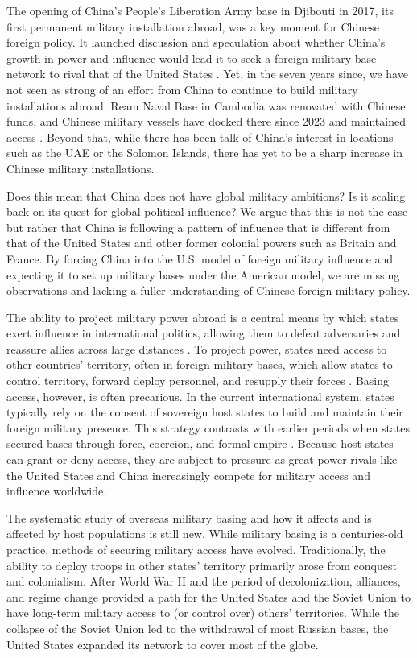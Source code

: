 The opening of China's People's Liberation Army base in Djibouti in 2017, its first permanent military installation abroad, was a key moment for Chinese foreign policy. It launched discussion and speculation about whether China's growth in power and influence would lead it to seek a foreign military base network to rival that of the United States \cite{vertin2020}. Yet, in the seven years since, we have not seen as strong of an effort from China to continue to build military installations abroad. Ream Naval Base in Cambodia was renovated with Chinese funds, and Chinese military vessels have docked there since 2023 and maintained access \cite{gan2023}. Beyond that, while there has been talk of China's interest in locations such as the UAE or the Solomon Islands, there has yet to be a sharp increase in Chinese military installations.

Does this mean that China does not have global military ambitions? Is it scaling back on its quest for global political influence? We argue that this is not the case but rather that China is following a pattern of influence that is different from that of the United States and other former colonial powers such as Britain and France. By forcing China into the U.S. model of foreign military influence and expecting it to set up military bases under the American model, we are missing observations and lacking a fuller understanding of Chinese foreign military policy. 

The ability to project military power abroad is a central means by which states exert influence in international politics, allowing them to defeat adversaries and reassure allies across large distances \cite{levy2010,markowitz2013,blankenship2022}. To project power, states need access to other countries' territory, often in foreign military bases, which allow states to control territory, forward deploy personnel, and resupply their forces \cite{Harkavy1989,posen2003}. Basing access, however, is often precarious. In the current international system, states typically rely on the consent of sovereign host states to build and maintain their foreign military presence. This strategy contrasts with earlier periods when states secured bases through force, coercion, and formal empire \cite{schmidt2020}. Because host states can grant or deny access, they are subject to pressure as great power rivals like the United States and China increasingly compete for military access and influence worldwide.

The systematic study of overseas military basing and how it affects and is affected by host populations is still new. While military basing is a centuries-old practice, methods of securing military access have evolved. Traditionally, the ability to deploy troops in other states' territory primarily arose from conquest and colonialism. After World War II and the period of decolonization, alliances, and regime change provided a path for the United States and the Soviet Union to have long-term military access to (or control over) others' territories. While the collapse of the Soviet Union led to the withdrawal of most Russian bases, the United States expanded its network to cover most of the globe.

